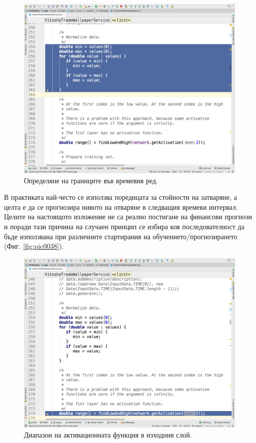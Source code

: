 \documentclass[book,14pt,oneside,openany]{memoir}
\begin{document}
\begin{figure}[h]
  \centering
  \includegraphics[height=0.45\pdfpageheight]{./images/pic0039.png}
  \caption{Определяне на границите във времевия ред.}
\label{fig:pic0039}
\end{figure}
\FloatBarrier

В практиката най-често се използва поредицата за стойности на затваряне, а целта е да се прогнозира нивото на отваряне в следващия времеви интервал. Целите на настоящото изложение не са реално постигане на финансови прогнози и поради тази причина на случаен принцип се избира коя последователност да бъде използвана при различните стартирания на обучението/прогнозирането (Фиг. \ref{fig:pic0038}).

\begin{figure}[h]
  \centering
  \includegraphics[height=0.45\pdfpageheight]{./images/pic0040.png}
  \caption{Диапазон на активационната функция в изходния слой.}
\label{fig:pic0040}
\end{figure}
\FloatBarrier
\end{document}
